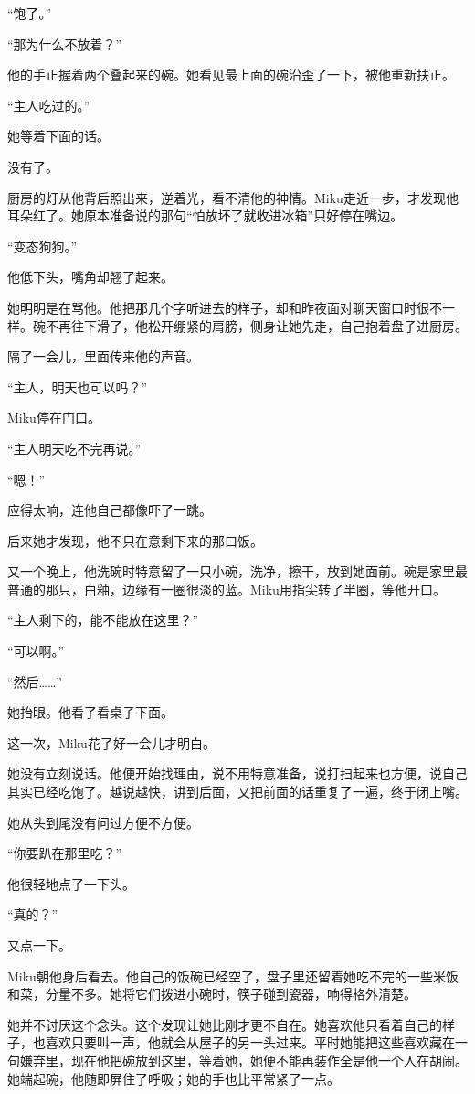 “饱了。”

“那为什么不放着？”

他的手正握着两个叠起来的碗。她看见最上面的碗沿歪了一下，被他重新扶正。

“主人吃过的。”

她等着下面的话。

没有了。

厨房的灯从他背后照出来，逆着光，看不清他的神情。Miku走近一步，才发现他耳朵红了。她原本准备说的那句“怕放坏了就收进冰箱”只好停在嘴边。

“变态狗狗。”

他低下头，嘴角却翘了起来。

她明明是在骂他。他把那几个字听进去的样子，却和昨夜面对聊天窗口时很不一样。碗不再往下滑了，他松开绷紧的肩膀，侧身让她先走，自己抱着盘子进厨房。

隔了一会儿，里面传来他的声音。

“主人，明天也可以吗？”

Miku停在门口。

“主人明天吃不完再说。”

“嗯！”

应得太响，连他自己都像吓了一跳。

后来她才发现，他不只在意剩下来的那口饭。

又一个晚上，他洗碗时特意留了一只小碗，洗净，擦干，放到她面前。碗是家里最普通的那只，白釉，边缘有一圈很淡的蓝。Miku用指尖转了半圈，等他开口。

“主人剩下的，能不能放在这里？”

“可以啊。”

“然后……”

她抬眼。他看了看桌子下面。

这一次，Miku花了好一会儿才明白。

她没有立刻说话。他便开始找理由，说不用特意准备，说打扫起来也方便，说自己其实已经吃饱了。越说越快，讲到后面，又把前面的话重复了一遍，终于闭上嘴。

她从头到尾没有问过方便不方便。

“你要趴在那里吃？”

他很轻地点了一下头。

“真的？”

又点一下。

Miku朝他身后看去。他自己的饭碗已经空了，盘子里还留着她吃不完的一些米饭和菜，分量不多。她将它们拨进小碗时，筷子碰到瓷器，响得格外清楚。

她并不讨厌这个念头。这个发现让她比刚才更不自在。她喜欢他只看着自己的样子，也喜欢只要叫一声，他就会从屋子的另一头过来。平时她能把这些喜欢藏在一句嫌弃里，现在他把碗放到这里，等着她，她便不能再装作全是他一个人在胡闹。她端起碗，他随即屏住了呼吸；她的手也比平常紧了一点。


